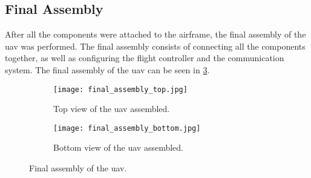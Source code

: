 \subsection{Final Assembly}\label{subsec:implementation_final_assembly}

After all the components were attached to the airframe, the final assembly of the \gls{uav} was performed. The final assembly consists of connecting all the components together, as well as configuring the flight controller and the communication system. The final assembly of the \gls{uav} can be seen in \cref{fig:uav_assembled}.

\begin{figure}
  \hfill
  \begin{subfigure}[t]{0.4\linewidth}
    \texttt{[image: final\_assembly\_top.jpg]}
    \caption{Top view of the \gls{uav} assembled.}\label{fig:uav_assembled_top}
  \end{subfigure}
  \hfill
  \begin{subfigure}[t]{0.4\linewidth}
    \texttt{[image: final\_assembly\_bottom.jpg]}
    \caption{Bottom view of the \gls{uav} assembled.}\label{fig:uav_assembled_bottom}
  \end{subfigure}
  \hfill

  \caption{Final assembly of the \gls{uav}.}\label{fig:uav_assembled}
\end{figure}
